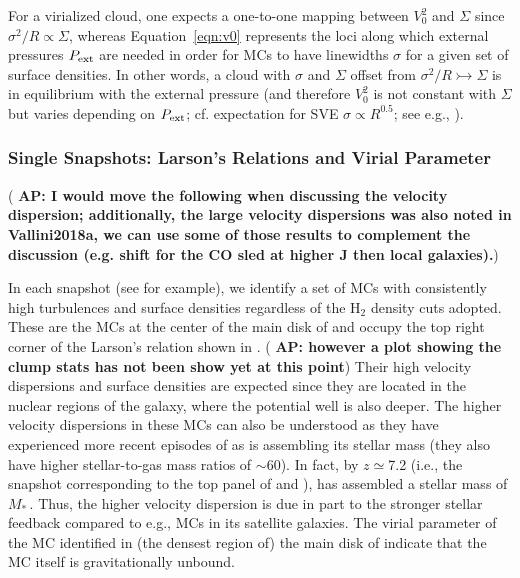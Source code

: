 \documentclass[iop]{emulateapj} %
\newcommand{\AP}[1]{({\bf \color{apcolor} AP: #1})}
\begin{document}
For a virialized cloud, one expects a one-to-one mapping between $V_0^2$ and $\Sigma$ since
$\sigma^2/R\propto\Sigma$, whereas
Equation~\ref{eqn:v0} represents the loci along which external pressures $P_{\rm ext}$ are
needed in order for MCs to have linewidths $\sigma$ for a given set of surface densities.
In other words, a cloud with $\sigma$ and $\Sigma$ offset from $\sigma^2/R\rightarrowtail\Sigma$
is in equilibrium with the external pressure (and therefore $V_0^2$ is not constant with $\Sigma$ but
varies depending on $P_{\rm ext}$; cf. expectation for SVE
$\sigma\propto R^{0.5}$; see e.g., \citealt{Heyer09a, Hughes10a, Hughes13b, Meidt13a}).


\subsubsection{Single Snapshots: Larson's Relations and Virial Parameter}  \label{sec:singless}

%
\AP{I would move the following when discussing the velocity dispersion; additionally, the large velocity dispersions was also noted in Vallini2018a, we can use some of those results to complement the discussion (e.g. shift for the CO sled at higher J then local galaxies).}

In each snapshot (see  for example),
we identify a set of MCs with consistently high turbulences and surface densities
regardless of the H$_2$ density cuts adopted.
These are the MCs at the center of the main disk of \flower and
occupy the top right corner of the Larson's relation shown in .
\AP{however a plot showing the clump stats has not been show yet at this point}
Their high velocity dispersions and surface densities are expected since
they are located in the nuclear regions of the
galaxy, where the potential well is also deeper. The higher velocity dispersions
in these MCs can also be understood as they have experienced more recent episodes
of \SF as \flower is assembling its stellar mass (they also have higher stellar-to-gas mass ratios of $\sim$60).
In fact, by $z\simeq$7.2 (i.e., the snapshot corresponding
to the top panel of  and ), \flower has assembled
a stellar mass of $M_*$\,\Msun. Thus, the higher velocity dispersion
is due in part to the stronger stellar feedback compared to e.g., MCs in its satellite galaxies.
The virial parameter of the MC identified in (the densest region of) the main disk of \flower
indicate that the MC itself is gravitationally unbound.
\end{document}
